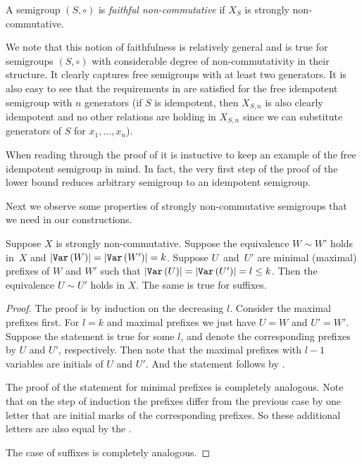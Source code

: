 \documentclass{toc}
\begin{document}
\begin{definition} 
	\label{def:faithful}
	A semigroup $(S, \circ)$ is \emph{faithful non-commutative} if $X_S$ is strongly
	non-commutative.
\end{definition}

We note that this notion of faithfulness is relatively general and is true for
semigroups $(S,\circ)$ with considerable degree of non-commutativity in their
structure. It clearly captures free semigroups with at least two generators. It
is also easy to see that the
requirements in  are satisfied for the free
idempotent semigroup with $n$ generators (if $S$ is idempotent, then $X_{S,n}$
is also clearly idempotent and no other relations are holding in $X_{S,n}$ since
we can substitute generators of $S$ for $x_1, \ldots, x_n$).

When reading through the proof of  it is instuctive to keep an example of the free idempotent semigroup in mind. In fact, the very first step of the proof of the lower bound reduces arbitrary semigroup to an idempotent semigroup.

Next we observe some properties of strongly non-commutative semigroups that we
need in our constructions.


\begin{lemma} \label{lem:prefix_equivalence}
Suppose $X$ is strongly non-commutative. Suppose the equivalence $W \sim W'$
holds in~$X$ and $|\texttt{Var}\,(W)|=|\texttt{Var}\,(W')|=k$. Suppose $U$~and~$U'$ are minimal
(maximal) prefixes of $W$ and $W'$ such that $|\texttt{Var}\,(U)| = |\texttt{Var}\,(U')| = l\leq k$.
Then the equivalence $U \sim U'$ holds in $X$. The same is true for suffixes.
\end{lemma}

\begin{proof}
The proof is by induction on the decreasing $l$. Consider the maximal prefixes
first. For $l=k$ and maximal prefixes we just have $U=W$ and $U'=W'$. Suppose
the statement is true for some $l$, and denote the corresponding prefixes by $U$
and $U'$, respectively. Then note that the maximal prefixes with $l-1$ variables
are initials of $U$ and $U'$. And the statement follows by
.

The proof of the statement for minimal prefixes is completely analogous. Note
that on the step of induction the prefixes differ from the previous case by one
letter that are initial marks of the corresponding prefixes. So these additional
letters are also equal by the .

The case of suffixes is completely analogous.
\end{proof}
\end{document}
